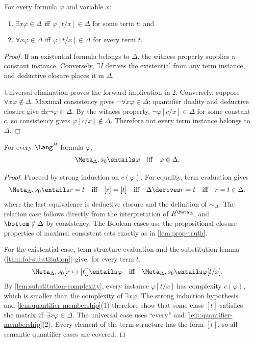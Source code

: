 \begin{lemma}
\label{lem:quantifier-membership}
For every formula \(\varphi\) and variable \(x\):
\begin{enumerate}
  \item \(\exists x\varphi\in\Delta\) iff
        \(\varphi[t/x]\in\Delta\) for some term \(t\); and
  \item \(\forall x\varphi\in\Delta\) iff
        \(\varphi[t/x]\in\Delta\) for every term \(t\).
\end{enumerate}
\end{lemma}
\begin{proof}
If an existential formula belongs to \(\Delta\), the witness property supplies
a constant instance.  Conversely, \(\exists I\) derives the existential from
any term instance, and deductive closure places it in \(\Delta\).

Universal elimination proves the forward implication in 2.  Conversely,
suppose \(\forall x\varphi\notin\Delta\).  Maximal consistency gives
\(\neg\forall x\varphi\in\Delta\); quantifier duality and deductive closure
give \(\exists x\neg\varphi\in\Delta\).  By the witness property,
\(\neg\varphi[c/x]\in\Delta\) for some constant \(c\), so consistency gives
\(\varphi[c/x]\notin\Delta\).  Therefore not every term instance belongs to
\(\Delta\).
\end{proof}

\begin{lemma}
\label{lem:fol-truth}
For every \(\Lang^H\)-formula \(\varphi\),
\[
 \Meta_\Delta,s_0\entails\varphi
 \quad\text{iff}\quad
 \varphi\in\Delta.
\]
\end{lemma}
\begin{proof}
Proceed by strong induction on \(c(\varphi)\).  For equality, term evaluation gives
\[
 \Meta_\Delta,s_0\entails r=t
 \quad\text{iff}\quad [r]=[t]
 \quad\text{iff}\quad \Delta\derives r=t
 \quad\text{iff}\quad r=t\in\Delta,
\]
where the last equivalence is deductive closure and the definition of
\(\sim_\Delta\).  The relation case follows directly from the interpretation
of \(R^{\Meta_\Delta}\), and \(\bottom\notin\Delta\) by consistency.  The
Boolean cases use the propositional closure properties of maximal consistent
sets exactly as in \cref{lem:prop-truth}.

For the existential case, term-structure evaluation and the substitution
lemma (\cref{thm:fol-substitution}) give, for every term \(t\),
\[
 \Meta_\Delta,s_0[x\mapsto[t]]\entails\varphi
 \quad\text{iff}\quad
 \Meta_\Delta,s_0\entails\varphi[t/x].
\]
By \cref{lem:substitution-complexity}, every instance
\(\varphi[t/x]\) has complexity \(c(\varphi)\), which is smaller than the
complexity of \(\exists x\varphi\).  The strong induction hypothesis and
\cref{lem:quantifier-membership}(1) therefore show that
some class \([t]\) satisfies the matrix iff \(\exists x\varphi\in\Delta\).
The universal case uses ``every'' and
\cref{lem:quantifier-membership}(2).  Every element of the term structure has the
form \([t]\), so all semantic quantifier cases are covered.
\end{proof}

